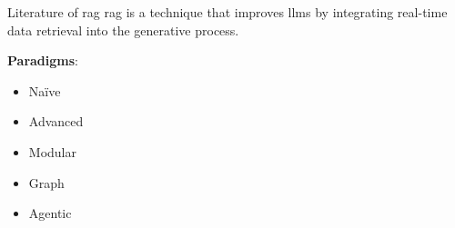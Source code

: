 \begin{tframe}{Literature of \gls{rag}}
\gls{rag} is a technique that improves \glspl{llm} by integrating real-time data retrieval into the generative process.
\vspace{0.2cm}

\textbf{Paradigms}:
\begin{itemize}
    \item Na\"ive
    \item Advanced
    \item Modular
    \item Graph
    \item Agentic
\end{itemize}
\end{tframe}
